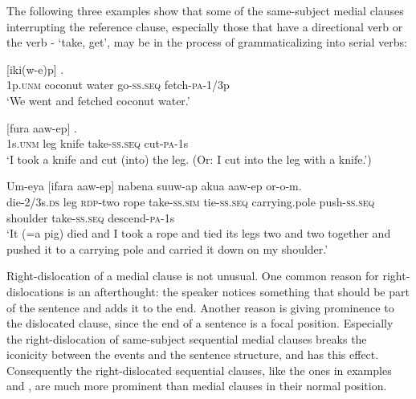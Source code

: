 The following three examples show that some of the same-subject medial clauses interrupting the reference clause, especially those that have a directional verb or the verb - `take, get', may be in the process of grammaticalizing into serial verbs: 

\ea%
\label{ex:8:x1466}
\gll {}    [iki(w-e)p]  . \\
1p.\textsc{unm} coconut  water  go-\textsc{ss}.\textsc{seq} fetch-\textsc{pa}-1/3p\\
\glt`We went and fetched coconut water.'
\z


\ea%
\label{ex:8:x1467}
\gll {}    [fura  aaw-ep]  . \\
1s.\textsc{unm} leg  knife  take-\textsc{ss}.\textsc{seq} cut-\textsc{pa}-1s\\
\glt`I took a knife and cut (into) the leg. (Or: I cut into the leg with a knife.')
\z


\ea%
\label{ex:8:x1468}
\gll Um-eya      [ifara  aaw-ep]   nabena  suuw-ap  akua  aaw-ep  or-o-m.\\
die-2/3s.\textsc{ds} leg \textsc{rdp}-two rope take-\textsc{ss}.\textsc{sim} tie-\textsc{ss}.\textsc{seq} carrying.pole push-\textsc{ss}.\textsc{seq} shoulder take-\textsc{ss}.\textsc{seq} descend-\textsc{pa}-1s\\
\glt`It (=a pig) died and I took a rope and tied its legs two and two together and pushed it to a carrying pole and carried it down on my shoulder.'
\z


Right-dislocation of a medial clause is not unusual. One common reason for right-dislocations is an afterthought: the speaker notices something that should be part of the sentence and adds it to the end. Another reason is giving prominence to the dislocated clause, since the end of a sentence is a focal position. Especially the right-dislocation of same-subject sequential medial clauses breaks the iconicity between the events and the sentence structure, and has this effect. Consequently the right-dislocated  sequential clauses, like the ones in examples  and , are much more prominent than medial clauses in their normal position.

